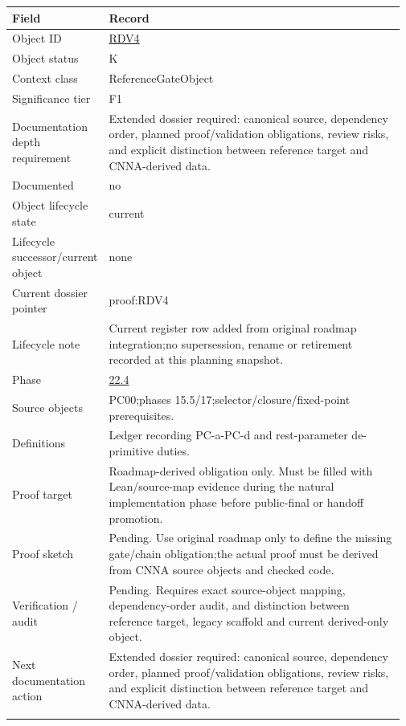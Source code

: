 \begin{longtable}{L{0.16\linewidth} L{0.81\linewidth}}
\hline
\textbf{Field} & \textbf{Record}\\
\hline
Object ID & \hyperlink{object-row-RDV4}{RDV4}\\
\hline\addlinespace[0.20em]
Object status & K\\
\hline\addlinespace[0.20em]
Context class & ReferenceGateObject\\
\hline\addlinespace[0.20em]
Significance tier & F1\\
\hline\addlinespace[0.20em]
Documentation depth requirement & Extended dossier required: canonical source, dependency order, planned proof/\allowbreak{}validation obligations, review risks, and explicit distinction between reference target and CNNA-derived data.\\
\hline\addlinespace[0.20em]
Documented & no\\
\hline\addlinespace[0.20em]
Object lifecycle state & current\\
\hline\addlinespace[0.20em]
Lifecycle successor/\allowbreak{}current object & none\\
\hline\addlinespace[0.20em]
Current dossier pointer & proof:RDV4\\
\hline\addlinespace[0.20em]
Lifecycle note & Current register row added from original roadmap integration;\newline no supersession, rename or retirement recorded at this planning snapshot.\\
\hline\addlinespace[0.20em]
Phase & \hyperlink{phase-row-22-4}{22.4}\\
\hline\addlinespace[0.20em]
Source objects & PC00;\newline phases 15.5/\allowbreak{}17;\newline selector/\allowbreak{}closure/\allowbreak{}fixed-point prerequisites.\\
\hline\addlinespace[0.20em]
Definitions & Ledger recording PC-a-PC-d and rest-parameter de-primitive duties.\\
\hline\addlinespace[0.20em]
Proof target & Roadmap-derived obligation only. Must be filled with Lean/\allowbreak{}source-map evidence during the natural implementation phase before public-final or handoff promotion.\\
\hline\addlinespace[0.20em]
Proof sketch & Pending. Use original roadmap only to define the missing gate/\allowbreak{}chain obligation;\newline the actual proof must be derived from CNNA source objects and checked code.\\
\hline\addlinespace[0.20em]
Verification /\allowbreak{} audit & Pending. Requires exact source-object mapping, dependency-order audit, and distinction between reference target, legacy scaffold and current derived-only object.\\
\hline\addlinespace[0.20em]
Next documentation action & Extended dossier required: canonical source, dependency order, planned proof/\allowbreak{}validation obligations, review risks, and explicit distinction between reference target and CNNA-derived data.\\
\hline\addlinespace[0.20em]
\end{longtable}
